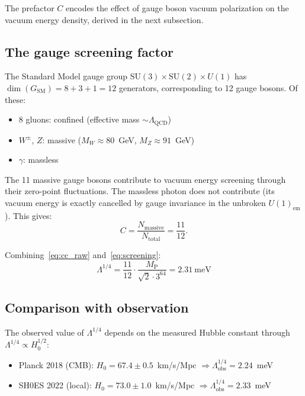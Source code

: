 \documentclass[12pt,a4paper]{article}
\theoremstyle{definition}
\theoremstyle{remark}
\newcommand{\SU}{\mathrm{SU}}
\newcommand{\MP}{M_{\mathrm{P}}}
\begin{document}
The prefactor $C$ encodes the effect of gauge boson vacuum polarization 
on the vacuum energy density, derived in the next subsection.

\subsection{The gauge screening factor}
\label{sec:screening}

The Standard Model gauge group $\SU(3)\times\SU(2)\times U(1)$ has 
$\dim(G_{\mathrm{SM}}) = 8 + 3 + 1 = 12$ generators, corresponding to 
12 gauge bosons. Of these:
\begin{itemize}
\item 8 gluons: confined (effective mass $\sim\Lambda_{\mathrm{QCD}}$)
\item $W^\pm$, $Z$: massive ($M_W \approx 80$~GeV, $M_Z \approx 91$~GeV)
\item $\gamma$: massless
\end{itemize}

The 11 massive gauge bosons contribute to vacuum energy screening through 
their zero-point fluctuations. The massless photon does not contribute 
(its vacuum energy is exactly cancelled by gauge invariance in the 
unbroken $U(1)_{\mathrm{em}}$). This gives:
\begin{equation}
C = \frac{N_{\mathrm{massive}}}{N_{\mathrm{total}}} = \frac{11}{12}.
\label{eq:screening}
\end{equation}

Combining~\eqref{eq:cc_raw} and~\eqref{eq:screening}:
\begin{equation}
\boxed{\Lambda^{1/4} = \frac{11}{12}\cdot\frac{\MP}{\sqrt{2}\cdot 3^{64}} 
= 2.31~\text{meV}}
\label{eq:cc_final}
\end{equation}

\subsection{Comparison with observation}

The observed value of $\Lambda^{1/4}$ depends on the measured Hubble 
constant through $\Lambda^{1/4} \propto H_0^{1/2}$:
\begin{itemize}
\item Planck 2018 (CMB): $H_0 = 67.4 \pm 0.5$~km/s/Mpc 
$\Rightarrow \Lambda^{1/4}_{\mathrm{obs}} = 2.24$~meV
\item SH0ES 2022 (local): $H_0 = 73.0 \pm 1.0$~km/s/Mpc 
$\Rightarrow \Lambda^{1/4}_{\mathrm{obs}} = 2.33$~meV
\end{itemize}
\end{document}

